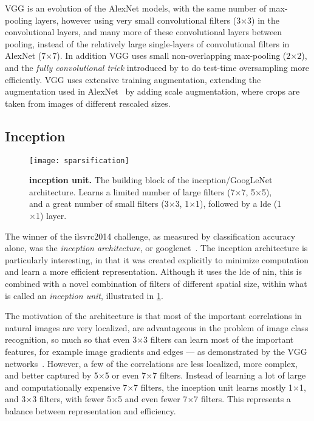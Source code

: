 \documentclass[thesis]{subfiles}
\begin{document}
VGG is an evolution of the AlexNet models, with the same number of max-pooling layers, however using very small convolutional filters ($3$$\times$$3$) in the convolutional layers, and many more of these convolutional layers between pooling, instead of the relatively large single-layers of convolutional filters in AlexNet ($7$$\times$$7$). In addition VGG uses small non-overlapping max-pooling ($2$$\times$$2$), and the \emph{fully convolutional trick} introduced by \citet{Sermanet2013overfeat} to do test-time oversampling more efficiently. VGG uses extensive training augmentation, extending the augmentation used in AlexNet~\citep{Krizhevsky2012} by adding scale augmentation, where crops are taken from images of different rescaled sizes. 

\subsection{Inception}
\begin{figure}
	\centering
	\texttt{[image: sparsification]}
	\caption[Illustration of the inception unit]{\textbf{\Gls{inception} unit.} The building block of the \gls{inception}/GoogLeNet architecture. Learns a limited number of large filters (7$\times$7, 5$\times$5), and a great number of small filters (3$\times$3, 1$\times$1), followed by a \gls{lde} (1$\times$1) layer.}\label{fig:inceptionunit}
\end{figure}
The winner of the \gls{ilsvrc}2014 challenge, as measured by classification accuracy alone, was the \emph{\gls{inception} architecture}, or \gls{googlenet}~\citep{Szegedy2014going}. The \gls{inception} architecture is particularly interesting, in that it was created explicitly to minimize computation and learn a more efficient representation. Although it uses the \gls{lde} of \gls{nin}, this is combined with a novel combination of filters of different spatial size, within what is called an \emph{\gls{inception} unit}, illustrated in \cref{fig:inceptionunit}.

The motivation of the architecture is that most of the important correlations in natural images are very localized, are advantageous in the problem of image class recognition, so much so that even 3$\times$3 filters can learn most of the important features, for example image gradients and edges --- as demonstrated by the VGG networks~\citep{Simonyan2014verydeep}. However, a few of the correlations are less localized, more complex, and better captured by 5$\times$5 or even 7$\times$7 filters. Instead of learning a lot of large and computationally expensive 7$\times$7 filters, the \gls{inception} unit learns mostly 1$\times$1, and 3$\times$3 filters, with fewer 5$\times$5 and even fewer 7$\times$7 filters. This represents a balance between representation and efficiency.
\end{document}
